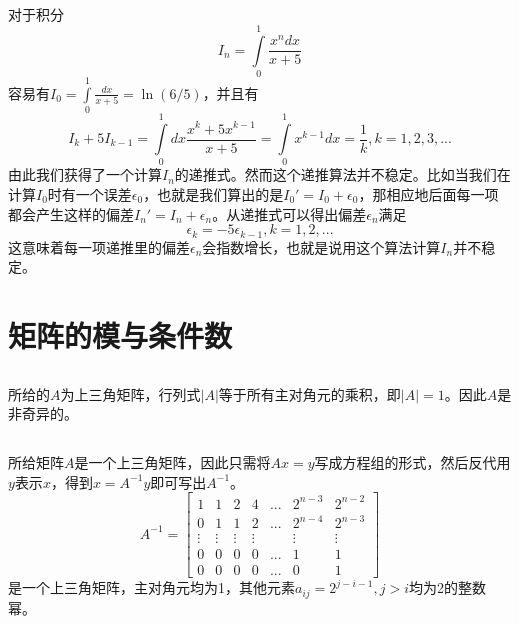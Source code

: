\documentclass[UTF8]{ctexart}
\begin{document}
\subsection{}

对于积分
\begin{equation}
I_n=\int\limits_0^1\frac{x^ndx}{x+5}
\end{equation}
容易有$I_0=\int\limits_0^1\frac{dx}{x+5}=\ln(6/5)$，并且有
\begin{equation}
I_k+5I_{k-1}=\int\limits_0^1dx\frac{x^k+5x^{k-1}}{x+5}=\int\limits_0^1x^{k-1}dx=\frac{1}{k},k=1,2,3,...
\end{equation}
由此我们获得了一个计算$I_n$的递推式。然而这个递推算法并不稳定。比如当我们在计算$I_0$时有一个误差$\epsilon_0$，也就是我们算出的是$I_0'=I_0+\epsilon_0$，那相应地后面每一项都会产生这样的偏差$I_n'=I_n+\epsilon_n$。从递推式可以得出偏差$\epsilon_n$满足
\begin{equation}
\epsilon_k=-5\epsilon_{k-1},k=1,2,...
\end{equation}
这意味着每一项递推里的偏差$\epsilon_n$会指数增长，也就是说用这个算法计算$I_n$并不稳定。

\section{矩阵的模与条件数}
\subsection{}
所给的$A$为上三角矩阵，行列式$\lvert A \rvert$等于所有主对角元的乘积，即$\lvert A \rvert=1$。因此$A$是非奇异的。
\subsection{}
所给矩阵$A$是一个上三角矩阵，因此只需将$Ax=y$写成方程组的形式，然后反代用$y$表示$x$，得到$x=A^{-1}y$即可写出$A^{-1}$。
\begin{equation}
A^{-1}
=\begin{bmatrix}
1&1&2&4&...&2^{n-3}&2^{n-2}\\
0&1&1&2&...&2^{n-4}&2^{n-3}\\
\vdots&\vdots&\vdots&\vdots&&\vdots&\vdots\\
0&0&0&0&...&1&1\\
0&0&0&0&...&0&1 
\end{bmatrix}
\end{equation}
是一个上三角矩阵，主对角元均为1，其他元素$a_{ij}=2^{j-i-1},j>i$均为2的整数幂。
\end{document}
